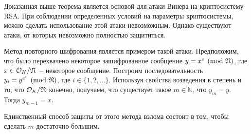 \documentclass[_00_dissertation.tex]{subfiles}
\begin{document}
Доказанная выше теорема является основой для атаки Винера на криптосистему RSA.
При соблюдении определенных условий на параметры криптосистемы, можно сделать использование этой атаки невозможным.
Однако существуют атаки, от которых невозможно полностью защититься.

Метод повторного шифрования является примером такой атаки.
Предположим, что было перехвачено некоторое зашифрованное сообщение $y = x^e \pmod{\mathfrak{N}}$, где $x \in \mathcal{O}_K / \mathfrak{N}$~-- некоторое сообщение.
Построим последовательность $y_i = y^{e^i} \pmod{\mathfrak{N}}$, где $i \in \{1, 2, \ldots\}$.
Используя свойства возведения в степень и то, что $\mathcal{O}_K / \mathfrak{N}$ конечно, получаем, что существует такое $m \in \mathbb{N}$, что $y_m = y$.
Тогда $y_{m-1} = x$.

Единственный способ защиты от этого метода взлома состоит в том, чтобы сделать $m$ достаточно большим.
\end{document}
